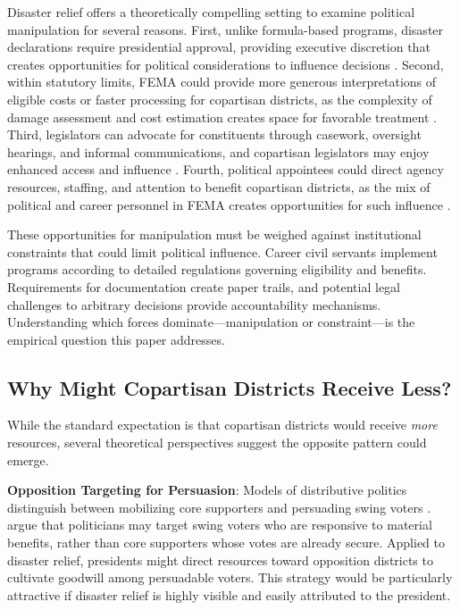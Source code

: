 \documentclass[12pt,letterpaper,oneside]{book}
\begin{document}
Disaster relief offers a theoretically compelling setting to examine political manipulation for several reasons. First, unlike formula-based programs, disaster declarations require presidential approval, providing executive discretion that creates opportunities for political considerations to influence decisions \citep{reeves2011political, gasper2011make}. Second, within statutory limits, FEMA could provide more generous interpretations of eligible costs or faster processing for copartisan districts, as the complexity of damage assessment and cost estimation creates space for favorable treatment \citep{mccarthy2011stafford}. Third, legislators can advocate for constituents through casework, oversight hearings, and informal communications, and copartisan legislators may enjoy enhanced access and influence \citep{ritchie2018back, lowande2018descriptive}. Fourth, political appointees could direct agency resources, staffing, and attention to benefit copartisan districts, as the mix of political and career personnel in FEMA creates opportunities for such influence \citep{lewis2008politics}.

These opportunities for manipulation must be weighed against institutional constraints that could limit political influence. Career civil servants implement programs according to detailed regulations governing eligibility and benefits. Requirements for documentation create paper trails, and potential legal challenges to arbitrary decisions provide accountability mechanisms. Understanding which forces dominate---manipulation or constraint---is the empirical question this paper addresses.

\subsection{Why Might Copartisan Districts Receive Less?}

While the standard expectation is that copartisan districts would receive \emph{more} resources, several theoretical perspectives suggest the opposite pattern could emerge.

\textbf{Opposition Targeting for Persuasion}: Models of distributive politics distinguish between mobilizing core supporters and persuading swing voters \citep{cox1986electoral, dixit1996determinants}. \cite{lindbeck1987balanced} argue that politicians may target swing voters who are responsive to material benefits, rather than core supporters whose votes are already secure. Applied to disaster relief, presidents might direct resources toward opposition districts to cultivate goodwill among persuadable voters. This strategy would be particularly attractive if disaster relief is highly visible and easily attributed to the president.
\end{document}
